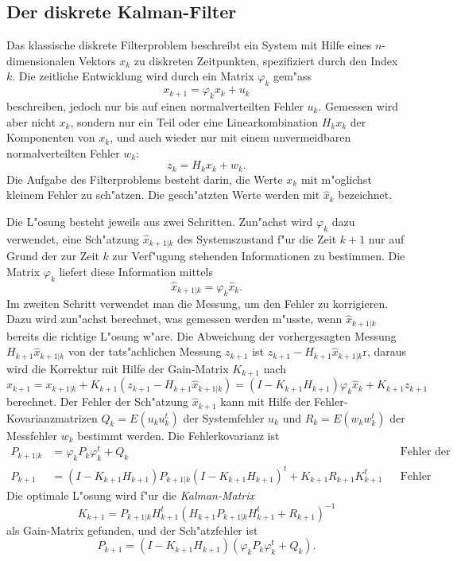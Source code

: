 \subsection{Der diskrete Kalman-Filter\label{skript:diskreter-kalman-filter}}
Das klassische diskrete Filterproblem beschreibt ein System mit Hilfe
eines $n$-dimensionalen Vektors $x_k$ zu diskreten Zeitpunkten, spezifiziert
durch den Index $k$.
Die zeitliche Entwicklung wird durch ein Matrix $\varphi_k$
gem"ass
\begin{equation}
x_{k+1} = \varphi_k x_k + u_k
\label{stochastisch:diskrete-entwicklungs-gleichung}
\end{equation}
beschreiben, jedoch nur bis auf einen normalverteilten Fehler $u_k$.
Gemessen wird aber nicht $x_k$, sondern nur ein Teil oder eine
Linearkombination $H_kx_k$ der Komponenten von $x_k$, und auch wieder
nur mit einem unvermeidbaren normalverteilten Fehler $w_k$:
\[
z_k=H_kx_k + w_k.
\]
Die Aufgabe des Filterproblems besteht darin, die Werte $x_k$ mit m"oglichst
kleinem Fehler zu sch"atzen.
Die gesch"atzten Werte werden mit $\hat x_k$ bezeichnet.

Die L"osung besteht jeweils aus zwei Schritten. 
Zun"achst wird $\varphi_k$ dazu verwendet, eine Sch"atzung $\hat x_{k+1|k}$
des Systemszustand f"ur die Zeit $k+1$ nur auf Grund der zur Zeit
$k$ zur Verf"ugung stehenden Informationen zu bestimmen.
Die Matrix $\varphi_k$ liefert diese Information mittels
\[
\hat x_{k+1|k} = \varphi_k \hat x_k.
\]
Im zweiten Schritt verwendet man die Messung, um den Fehler zu korrigieren.
Dazu wird zun"achst berechnet, was gemessen werden m"usste, wenn
$\hat x_{k+1|k}$ bereits die richtige L"osung w"are.
Die Abweichung der vorhergesagten Messung $H_{k+1}\hat x_{k+1|k}$
von der tats"achlichen Messung $z_{k+1}$ ist
$z_{k+1}-H_{k+1}\hat x_{k+1|k}$r, daraus wird die Korrektur mit Hilfe
der Gain-Matrix $K_{k+1}$ nach
%
\[
\hat x_{k+1}
=
x_{k+1|k} + K_{k+1}(z_{k+1} - H_{k+1} \hat x_{k+1|k})
=
(I-K_{k+1}H_{k+1}) \varphi_{k}\hat x_k + K_{k+1}z_{k+1}
\]
berechnet.
Der Fehler der Sch"atzung $\hat x_{k+1}$ kann mit Hilfe der
Fehler-Kovarianzmatrizen $Q_k=E(u_ku^t_k)$ der Systemfehler $u_k$
und $R_k=E(w_kw_k^t)$ der Messfehler $w_k$ bestimmt werden.
Die Fehlerkovarianz ist
\begin{align*}
P_{k+1|k}
&=
\varphi_k P_k \varphi_k^t + Q_k
&
&\text{Fehler der Vorhersage}
\\
P_{k+1}
&=
(I-K_{k+1}H_{k+1})P_{k+1|k}(I-K_{k+1}H_{k+1})^t + K_{k+1}R_{k+1}K_{k+1}^t
&
&\text{Fehler nach Korrektur}
\end{align*}
Die optimale L"osung wird f"ur die {\em Kalman-Matrix}
\[
K_{k+1}
=
P_{k+1|k}H_{k+1}^t(H_{k+1}P_{k+1|k}H_{k+1}^t + R_{k+1})^{-1}
\]
als Gain-Matrix gefunden, und der Sch"atzfehler ist
\[
P_{k+1}=(I-K_{k+1}H_{k+1})(\varphi_{k}P_k\varphi_k^t+Q_k).
\]

